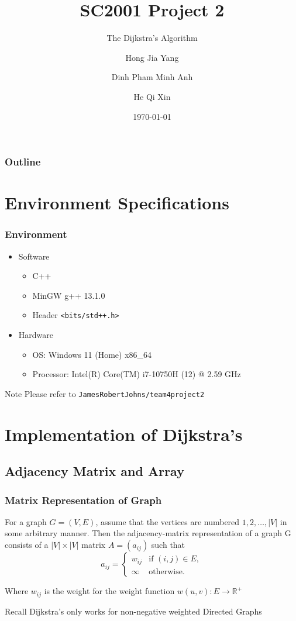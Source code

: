 \documentclass{beamer}
\title{SC2001 Project 2}
\subtitle{The Dijkstra's Algorithm}
\author[Hong, Dinh, He]{Hong Jia Yang \and Dinh Pham Minh Anh \and He Qi Xin}
\institute{Team 4}
\date{\today}
\begin{document}
\begin{frame}
	\titlepage
\end{frame}

\begin{frame}
	\frametitle{Outline}
	\tableofcontents
\end{frame}

\section{Environment Specifications}
\begin{frame}
	\frametitle{Environment}
	\begin{itemize}
		\item Software
		\begin{itemize}
			\item C++
			\item MinGW g++ 13.1.0	
			\item Header \texttt{<bits/std++.h>} 
		\end{itemize}
		\item Hardware
		\begin{itemize}
			\item OS: Windows 11 (Home) x86\_64
			\item Processor: Intel(R) Core(TM) i7-10750H (12) @ 2.59 GHz
		\end{itemize}	
	\end{itemize}
	\begin{block}{Note}
		Please refer to \texttt{JamesRobertJohns/team4project2}
	\end{block}
\end{frame}

\section{Implementation of Dijkstra's}
\subsection{Adjacency Matrix and Array}

\begin{frame}
	\frametitle{Matrix Representation of Graph}
	For a graph \( G = (V, E) \), assume that the vertices are numbered \( 1, 2, \hdots, \lvert{ V }\rvert  \) in some arbitrary manner. Then the adjacency-matrix representation of a graph G consists of a \( \lvert{ V }\rvert \times \lvert{ V }\rvert  \) matrix \( A = (a_{ij}) \) such that
	\[
		a_{ij} = \begin{cases}
			w_{ij} & \text{if } (i, j) \in E,\\
			\infty & \text{otherwise.} 
		\end{cases}
	\]

	Where \( w_{ij} \) is the weight for the weight function \( w(u, v) : E \rightarrow \mathbb{R}^+ \) 
	\onslide<2> \begin{block}{Recall}
		Dijkstra's only works for non-negative weighted Directed Graphs	
	\end{block}
\end{frame}
\end{document}
